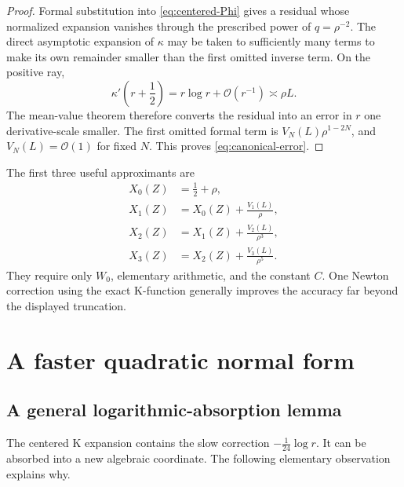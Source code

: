 \documentclass[11pt,a4paper]{article}
\numberwithin{equation}{section}
\theoremstyle{remark}
\newcommand{\bigO}{\mathcal O}
\begin{document}
\begin{proof}
Formal substitution into \cref{eq:centered-Phi} gives a residual whose
normalized expansion vanishes through the prescribed power of
\(q=\rho^{-2}\).  The direct asymptotic expansion of \(\kappa\) may be taken
to sufficiently many terms to make its own remainder smaller than the first
omitted inverse term.  On the positive ray,
\begin{equation}
\kappa'\!\left(r+\frac12\right)
=r\log r+\bigO(r^{-1})
\asymp \rho L.
\label{eq:kappa-derivative-scale}
\end{equation}
The mean-value theorem therefore converts the residual into an error in
\(r\) one derivative-scale smaller.  The first omitted formal term is
\(V_N(L)\rho^{1-2N}\), and \(V_N(L)=\bigO(1)\) for fixed \(N\).  This proves
\cref{eq:canonical-error}.
\end{proof}

\begin{practicalbox}
The first three useful approximants are
\begin{align*}
X_0(Z)&=\frac12+\rho,\\
X_1(Z)&=X_0(Z)+\frac{V_1(L)}{\rho},\\
X_2(Z)&=X_1(Z)+\frac{V_2(L)}{\rho^3},\\
X_3(Z)&=X_2(Z)+\frac{V_3(L)}{\rho^5}.
\end{align*}
They require only \(W_0\), elementary arithmetic, and the constant \(C\).
One Newton correction using the exact K-function generally improves the
accuracy far beyond the displayed truncation.
\end{practicalbox}

\section{A faster quadratic normal form}
\label{sec:accelerated}

\subsection{A general logarithmic-absorption lemma}

The centered K expansion contains the slow correction
\(-\tfrac1{24}\log r\).  It can be absorbed into a new algebraic coordinate.
The following elementary observation explains why.
\end{document}

